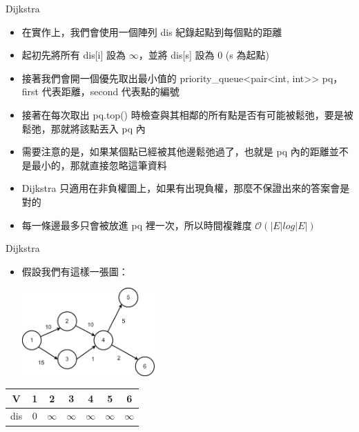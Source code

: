 \documentclass[aspectratio=169]{beamer}
\begin{document}
    \begin{frame}{Dijkstra}
        \begin{itemize}
            \item<1-> 在實作上，我們會使用一個陣列 dis 紀錄起點到每個點的距離
            \item<2-> 起初先將所有 dis[i] 設為 $\infty$，並將 dis[s] 設為 0 (s 為起點)
            \item<3-> 接著我們會開一個優先取出最小值的 priority\_queue<pair<int, int>> pq，first 代表距離，second 代表點的編號
            \item<4-> 接著在每次取出 pq.top() 時檢查與其相鄰的所有點是否有可能被鬆弛，要是被鬆弛，那就將該點丟入 pq 內
            \item<5-> 需要注意的是，如果某個點已經被其他邊鬆弛過了，也就是 pq 內的距離並不是最小的，那就直接忽略這筆資料
            \item<6-> Dijkstra 只適用在非負權圖上，如果有出現負權，那麼不保證出來的答案會是對的
            \item<7-> 每一條邊最多只會被放進 pq 裡一次，所以時間複雜度 $\mathcal{O}(\lvert E \rvert log \lvert E \rvert)$
        \end{itemize}
    \end{frame}

    \begin{frame}{Dijkstra}
        \begin{itemize}
            \item 假設我們有這樣一張圖：
            \begin{center}
                \includegraphics[width=0.4\textwidth]{src/dijkstra_1.png}
            \end{center}
        \end{itemize}

        \begin{center}
            \begin{tabular}{c|c|c|c|c|c|c}
                V & 1 & 2 & 3 & 4 & 5 & 6 \\
                \hline
                dis & 0 & $\infty$ & $\infty$ & $\infty$ & $\infty$ & $\infty$
            \end{tabular}
        \end{center}
    \end{frame}
\end{document}
